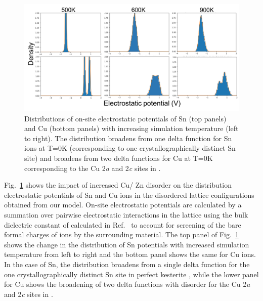 \documentclass[11pt, twoside]{report}
\begin{document}
\begin{figure}[]
  \centering
    \includegraphics[width=1.0\textwidth]{figures/pot_dists.png}
    \caption{Distributions of on-site electrostatic potentials of Sn (top panels) and Cu (bottom panels) with increasing simulation temperature (left to right). The distribution broadens from one delta function for Sn ions at T=0K (corresponding to one crystallographically distinct Sn site) and broadens from two delta functions for Cu at T=0K corresponding to the Cu 2\textit{a} and 2\textit{c} sites in {\CZTS}.}
  \label{pot_dists}
\end{figure}

Fig.~\ref{pot_dists} shows the impact of increased Cu/ Zn disorder on the distribution electrostatic potentials of Sn and Cu ions in the disordered lattice configurations obtained from our model. 
On-site electrostatic potentials are calculated by a summation over pairwise electrostatic interactions in the lattice using the bulk dielectric constant of {\CZTS} calculated in Ref.~\cite{Sunghyun_dielectric} to account for screening of the bare formal charges of ions by the surrounding material.
The top panel of Fig.~\ref{pot_dists} shows the change in the distribution of Sn potentials with increased simulation temperature from left to right and the bottom panel shows the same for Cu ions. In the case of Sn, the distribution broadens from a single delta function for the one crystallographically distinct Sn site in perfect kesterite {\CZTS}, while the lower panel for Cu shows the broadening of two delta functions with disorder for the Cu 2\textit{a} and 2\textit{c} sites in {\CZTS}.



\end{document}
